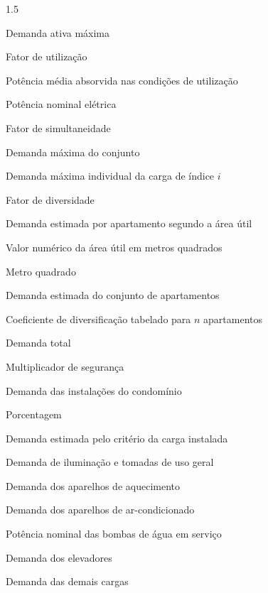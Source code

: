 \begin{Spacing}{1.5}
\begin{list}{}
  \item[$D_{\max}$] Demanda ativa máxima
  \item[$F_u$] Fator de utilização
  \item[$P_{\mathrm{util}}$] Potência média absorvida nas condições de utilização
  \item[$P_{\mathrm{n}}$] Potência nominal elétrica
  \item[$F_s$] Fator de simultaneidade
  \item[$D_{\max,\mathrm{conj}}$] Demanda máxima do conjunto
  \item[$D_{\max,i}$] Demanda máxima individual da carga de índice $i$
  \item[$F_{\mathrm{div}}$] Fator de diversidade
  \item[$d_{\mathrm{area}}$] Demanda estimada por apartamento segundo a área útil
  \item[$A_{\mathrm{util}}$] Valor numérico da área útil em metros quadrados
  \item[$\mathrm{m}^2$] Metro quadrado
  \item[$D_{\mathrm{ap}}$] Demanda estimada do conjunto de apartamentos
  \item[$C_{\mathrm{div}}(n)$] Coeficiente de diversificação tabelado para $n$ apartamentos
  \item[$D_{\mathrm{T}}$] Demanda total
  \item[$F_{\mathrm{seg}}$] Multiplicador de segurança
  \item[$D_{\mathrm{cond}}$] Demanda das instalações do condomínio
  \item[\%] Porcentagem
  \item[$D$] Demanda estimada pelo critério da carga instalada
  \item[$a$] Demanda de iluminação e tomadas de uso geral
  \item[$b$] Demanda dos aparelhos de aquecimento
  \item[$c$] Demanda dos aparelhos de ar-condicionado
  \item[$d$] Potência nominal das bombas de água em serviço
  \item[$e$] Demanda dos elevadores
  \item[$f$] Demanda das demais cargas
\end{list}
\end{Spacing}
\cleardoublepage
